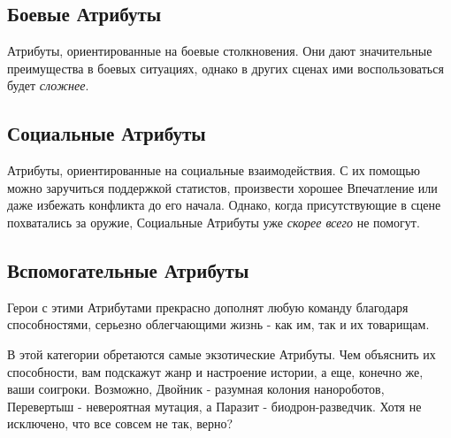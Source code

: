 
\subsection{Боевые Атрибуты}
Атрибуты, ориентированные на боевые столкновения. Они дают значительные преимущества в боевых ситуациях, однако в других сценах ими воспользоваться будет \textit{сложнее}.

\subsection{Социальные Атрибуты}
Атрибуты, ориентированные на социальные взаимодействия. С их помощью можно заручиться поддержкой статистов, произвести хорошее Впечатление или даже избежать конфликта до его начала. Однако, когда присутствующие в сцене похватались за оружие, Социальные Атрибуты уже \textit{скорее всего} не помогут.

\subsection{Вспомогательные Атрибуты}
Герои с этими Атрибутами прекрасно дополнят любую команду благодаря способностями, серьезно облегчающими жизнь - как им, так и их товарищам.
\begin{tcolorbox}
    В этой категории обретаются самые экзотические Атрибуты. Чем объяснить их способности, вам подскажут жанр и настроение истории, а еще, конечно же, ваши соигроки. Возможно, Двойник - разумная колония нанороботов, Перевертыш - невероятная мутация, а Паразит - биодрон-разведчик.  Хотя не исключено, что все совсем не так, верно? 
\end{tcolorbox}

\printindex[attributes]

